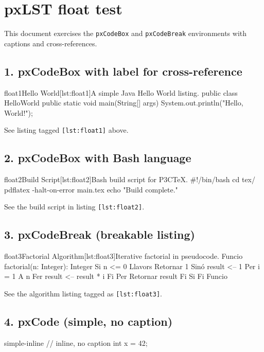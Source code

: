 \documentclass{article}
\begin{document}
\section*{pxLST float test}

This document exercises the \texttt{pxCodeBox} and \texttt{pxCodeBreak} environments
with captions and cross-references.

\subsection*{1. pxCodeBox with label for cross-reference}
\begin{pxCodeBox}{float1}{Hello World}{[lst:float1]}{A simple Java Hello World listing.}
public class HelloWorld {
    public static void main(String[] args) {
        System.out.println("Hello, World!");
    }
}
\end{pxCodeBox}

See listing tagged \texttt{[lst:float1]} above.

\subsection*{2. pxCodeBox with Bash language}
\begin{pxCodeBox}{float2}{Build Script}{[lst:float2]}{Bash build script for P3CTeX.}
#!/bin/bash
cd tex/
pdflatex -halt-on-error main.tex
echo "Build complete."
\end{pxCodeBox}

See the build script in listing \texttt{[lst:float2]}.

\subsection*{3. pxCodeBreak (breakable listing)}
\begin{pxCodeBreak}{float3}{Factorial Algorithm}{[lst:float3]}{Iterative factorial in pseudocode.}
Funcio factorial(n: Integer): Integer
  Si n <= 0 Llavors
    Retornar 1
  Sinó
    result <-- 1
    Per i = 1 A n Fer
      result <-- result * i
    Fi Per
    Retornar result
  Fi Si
Fi Funcio
\end{pxCodeBreak}

See the algorithm listing tagged as \texttt{[lst:float3]}.

\subsection*{4. pxCode (simple, no caption)}
\begin{pxCode}{simple-inline}
// inline, no caption
int x = 42;
\end{pxCode}
\end{document}
